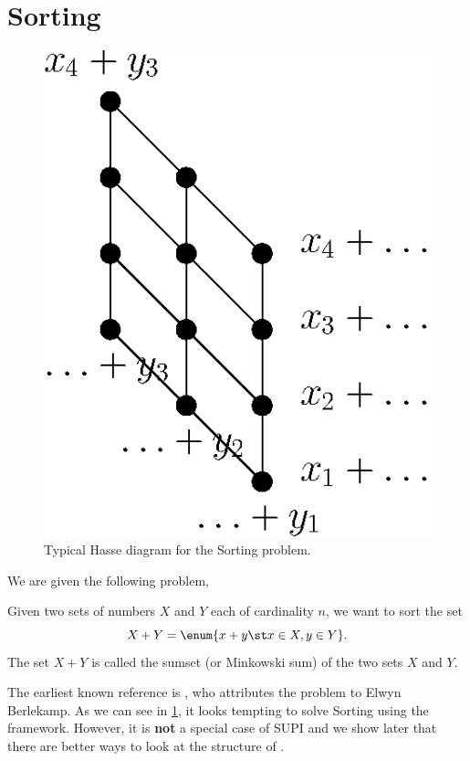 

\section{Sorting \XY}
\label{tree:related:xy}

\begin{figure}
	\centering
	\includegraphics[height=0.2\textheight]{fig/related/x+y}
	\caption{Typical Hasse diagram for the Sorting \XY problem.}
	\label{fig:related:xy}
\end{figure}

We are given the following problem,

\begin{problem}
Given two sets of numbers \(X\) and \(Y\) each of cardinality \(n\), we want to
sort the set
\begin{displaymath}
X + Y = \enum{x + y \st x \in X, y \in Y}.
\end{displaymath}
The set \(X + Y\) is called the sumset (or Minkowski sum) of the two sets \(X\) and
\(Y\).
\end{problem}

The earliest known reference is \citet*{fredman:1976}, who attributes
the problem to Elwyn Berlekamp. As we can see in \ref{fig:related:xy}, it
looks tempting to solve Sorting \XY using the  framework.
However, it is \textbf{not} a special case of SUPI and we show later that
there are better ways to look at the structure of \XY.

